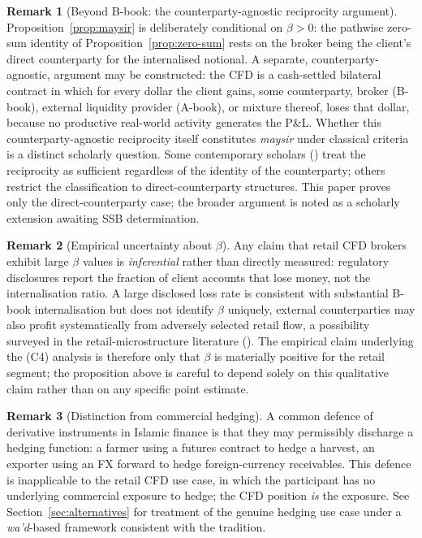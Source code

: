 \documentclass[preprint,12pt,authoryear]{elsarticle}
\theoremstyle{definition}
\newtheorem{remark}{Remark}[section]
\begin{document}
\begin{remark}[Beyond B-book: the counterparty-agnostic reciprocity
    argument]
\label{rem:maysir-beyond-beta}
Proposition~\ref{prop:maysir} is deliberately conditional on
$\beta > 0$: the pathwise zero-sum identity of
Proposition~\ref{prop:zero-sum} rests on the broker being the
client's direct counterparty for the internalised notional. A
separate, counterparty-agnostic, argument may be constructed: the
CFD is a cash-settled bilateral contract in which for every dollar
the client gains, some counterparty, broker (B-book), external
liquidity provider (A-book), or mixture thereof, loses that
dollar, because no productive real-world activity generates the
P\&L. Whether this counterparty-agnostic reciprocity itself
constitutes \emph{maysir} under classical criteria is a distinct
scholarly question. Some contemporary scholars
(\citealp{Usmani2002,ElGamal2006}) treat the reciprocity as
sufficient regardless of the identity of the counterparty; others
restrict the classification to direct-counterparty structures. This
paper proves only the direct-counterparty case; the broader
argument is noted as a scholarly extension awaiting SSB
determination.
\end{remark}

\begin{remark}[Empirical uncertainty about $\beta$]
\label{rem:beta-uncertainty}
Any claim that retail CFD brokers exhibit large $\beta$ values is
\emph{inferential} rather than directly measured: regulatory
disclosures report the fraction of client accounts that lose
money, not the internalisation ratio. A large disclosed loss rate
is consistent with substantial B-book internalisation but does not
identify $\beta$ uniquely, external counterparties may also
profit systematically from adversely selected retail flow, a
possibility surveyed in the retail-microstructure literature
(\citealp{BarberOdean2000}). The empirical claim underlying the
(C4) analysis is therefore only that $\beta$ is materially
positive for the retail segment; the proposition above is
careful to depend solely on this qualitative claim rather than
on any specific point estimate.
\end{remark}

\begin{remark}[Distinction from commercial hedging]
\label{rem:hedging-comparison}
A common defence of derivative instruments in Islamic finance is
that they may permissibly discharge a hedging function: a farmer
using a futures contract to hedge a harvest, an exporter using an
FX forward to hedge foreign-currency receivables. This defence is
inapplicable to the retail CFD use case, in which the participant
has no underlying commercial exposure to hedge; the CFD position
\emph{is} the exposure. See Section~\ref{sec:alternatives} for
treatment of the genuine hedging use case under a \emph{wa'd}-based
framework consistent with the \citet{Bacha2013} tradition.
\end{remark}
\end{document}
